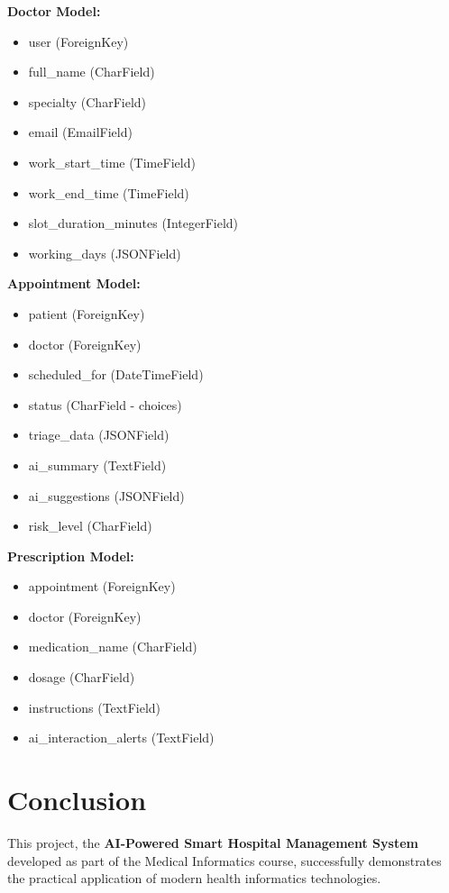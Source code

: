 \documentclass[12pt,a4paper]{article}
\begin{document}
\textbf{Doctor Model:}
\begin{itemize}
    \item user (ForeignKey)
    \item full\_name (CharField)
    \item specialty (CharField)
    \item email (EmailField)
    \item work\_start\_time (TimeField)
    \item work\_end\_time (TimeField)
    \item slot\_duration\_minutes (IntegerField)
    \item working\_days (JSONField)
\end{itemize}

\textbf{Appointment Model:}
\begin{itemize}
    \item patient (ForeignKey)
    \item doctor (ForeignKey)
    \item scheduled\_for (DateTimeField)
    \item status (CharField - choices)
    \item triage\_data (JSONField)
    \item ai\_summary (TextField)
    \item ai\_suggestions (JSONField)
    \item risk\_level (CharField)
\end{itemize}

\textbf{Prescription Model:}
\begin{itemize}
    \item appointment (ForeignKey)
    \item doctor (ForeignKey)
    \item medication\_name (CharField)
    \item dosage (CharField)
    \item instructions (TextField)
    \item ai\_interaction\_alerts (TextField)
\end{itemize}

\section{Conclusion}

This project, the \textbf{AI-Powered Smart Hospital Management System} developed as part of the Medical Informatics course, successfully demonstrates the practical application of modern health informatics technologies.
\end{document}
